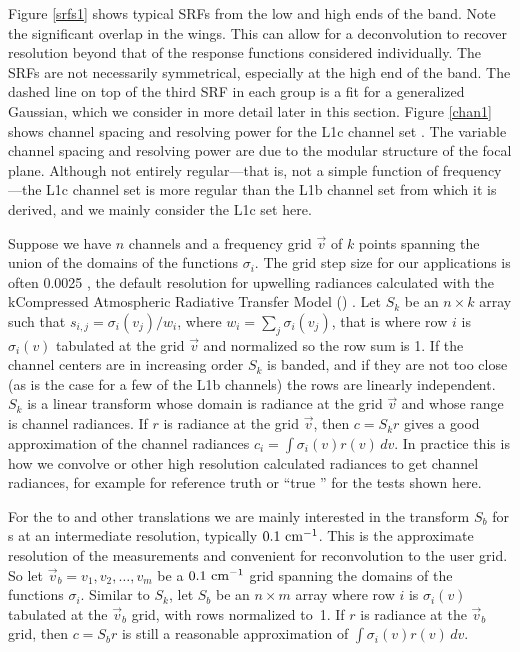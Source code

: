 \documentclass[10pt,twocolumn]{article}
\begin{document}
Figure \ref{srfs1} shows typical {\airs} SRFs from the low and high
ends of the band.  Note the significant overlap in the wings.  This
can allow for a deconvolution to recover resolution beyond that of
the response functions considered individually.  The SRFs are not
necessarily symmetrical, especially at the high end of the band.
The dashed line on top of the third SRF in each group is a fit for a
generalized Gaussian, which we consider in more detail later in this
section.  Figure \ref{chan1} shows channel spacing and resolving
power for the {\airs} L1c channel set \cite{a1c:atbd}.  The variable
channel spacing and resolving power are due to the modular structure
of the focal plane.  Although not entirely regular---that is, not a
simple function of frequency---the L1c channel set is more regular
than the L1b channel set from which it is derived, and we mainly
consider the L1c set here.

Suppose we have $n$ channels and a frequency grid $\vec v$ of $k$
points spanning the union of the domains of the functions
$\sigma_i$.  The grid step size for our applications is often 0.0025
{\wn}, the default resolution for upwelling radiances calculated
with the kCompressed Atmospheric Radiative Transfer Model (\kcarta)
\cite{kcarta1}.  Let $S_k$ be an $n\times k$ array such that
$s_{i,j} = \sigma_i(v_j)/w_i$, where $w_i = \sum_j \sigma_i(v_j)$,
that is where row $i$ is $\sigma_i(v)$ tabulated at the grid $\vec
v$ and normalized so the row sum is 1.  If the channel centers are
in increasing order $S_k$ is banded, and if they are not too close
(as is the case for a few of the L1b channels) the rows are linearly
independent.  $S_k$ is a linear transform whose domain is radiance
at the grid $\vec v$ and whose range is channel radiances.  If $r$
is radiance at the grid $\vec v$, then $c = S_k r$ gives a good
approximation of the channel radiances $c_i =
\int\sigma_i(v)r(v)\,dv$.  In practice this is how we convolve
{\kcarta} or other high resolution calculated radiances to get
{\airs} channel radiances, for example for reference truth or ``true
{\airs}'' for the tests shown here.


For the {\airs} to {\cris} and other translations we are mainly
interested in the transform $S_b$ for {\srf}s at an intermediate
resolution, typically $0.1~\mbox{cm$^{-1}$}$.  This is the approximate resolution
of the {\srf} measurements and convenient for reconvolution to the
{\cris} user grid.  So let $\vec v_b = v_1,v_2,\ldots,v_m$ be a
$0.1~\mbox{cm$^{-1}$}$ grid spanning the domains of the functions $\sigma_i$.
Similar to $S_k$, let $S_b$ be an $n\times m$ array where row $i$ is
$\sigma_i(v)$ tabulated at the $\vec v_b$ grid, with rows normalized
to~1.  If $r$ is radiance at the $\vec v_b$ grid, then $c = S_b r$
is still a reasonable approximation of $\int\sigma_i(v)r(v)\,dv$.
\end{document}
